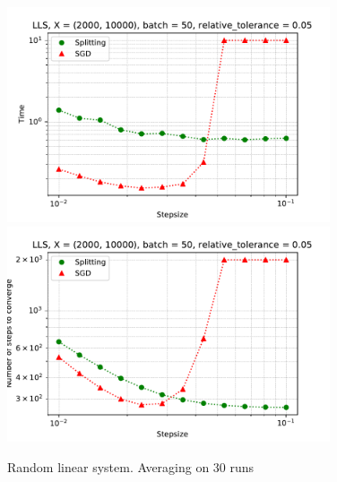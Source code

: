 \documentclass{article} %
\begin{document}
\begin{figure}
\includegraphics[width=0.85\textwidth]{sgd_split_iterations_lls.pdf} \\
\includegraphics[width=0.85\textwidth]{sgd_split_time_lls.pdf}

\caption{Random linear system. Averaging on 30 runs}
\end{figure}
\end{document}
